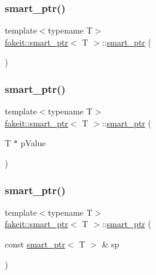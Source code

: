 \subsubsection{\texorpdfstring{smart\_ptr()}{smart\_ptr()}\hspace{0.1cm}{\footnotesize\ttfamily [7/27]}}
{\footnotesize\ttfamily template$<$typename T$>$ \\
\mbox{\hyperlink{classfakeit_1_1smart__ptr}{fakeit\+::smart\+\_\+ptr}}$<$ T $>$\+::\mbox{\hyperlink{classfakeit_1_1smart__ptr}{smart\+\_\+ptr}} (\begin{DoxyParamCaption}{ }\end{DoxyParamCaption})\hspace{0.3cm}{\ttfamily [inline]}}

\mbox{\label{classfakeit_1_1smart__ptr_afa05248e2dceb62a7ecc706700cfd1bf}} 
\subsubsection{\texorpdfstring{smart\_ptr()}{smart\_ptr()}\hspace{0.1cm}{\footnotesize\ttfamily [8/27]}}
{\footnotesize\ttfamily template$<$typename T$>$ \\
\mbox{\hyperlink{classfakeit_1_1smart__ptr}{fakeit\+::smart\+\_\+ptr}}$<$ T $>$\+::\mbox{\hyperlink{classfakeit_1_1smart__ptr}{smart\+\_\+ptr}} (\begin{DoxyParamCaption}\item[{T $\ast$}]{p\+Value }\end{DoxyParamCaption})\hspace{0.3cm}{\ttfamily [inline]}}

\mbox{\label{classfakeit_1_1smart__ptr_a1157d28b4675e32ae90886871fb1b0bd}} 
\subsubsection{\texorpdfstring{smart\_ptr()}{smart\_ptr()}\hspace{0.1cm}{\footnotesize\ttfamily [9/27]}}
{\footnotesize\ttfamily template$<$typename T$>$ \\
\mbox{\hyperlink{classfakeit_1_1smart__ptr}{fakeit\+::smart\+\_\+ptr}}$<$ T $>$\+::\mbox{\hyperlink{classfakeit_1_1smart__ptr}{smart\+\_\+ptr}} (\begin{DoxyParamCaption}\item[{const \mbox{\hyperlink{classfakeit_1_1smart__ptr}{smart\+\_\+ptr}}$<$ T $>$ \&}]{sp }\end{DoxyParamCaption})\hspace{0.3cm}{\ttfamily [inline]}}


